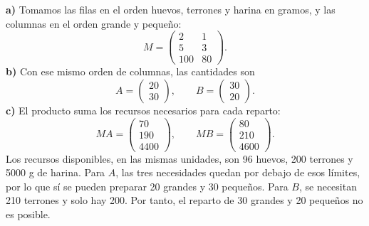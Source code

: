 \textbf{a)} Tomamos las filas en el orden huevos, terrones y harina en gramos, y las columnas en el orden grande y pequeño:
\[
 M=\boxed{\begin{pmatrix}2&1\\5&3\\100&80\end{pmatrix}}.
\]
\textbf{b)} Con ese mismo orden de columnas, las cantidades son
\[
 A=\begin{pmatrix}20\\30\end{pmatrix},\qquad
 B=\begin{pmatrix}30\\20\end{pmatrix}.
\]
\textbf{c)} El producto suma los recursos necesarios para cada reparto:
\[
 MA=\begin{pmatrix}70\\190\\4400\end{pmatrix},
 \qquad MB=\begin{pmatrix}80\\210\\4600\end{pmatrix}.
\]
Los recursos disponibles, en las mismas unidades, son 96 huevos, 200 terrones y 5000 g de harina. Para $A$, las tres necesidades quedan por debajo de esos límites, por lo que sí se pueden preparar 20 grandes y 30 pequeños. Para $B$, se necesitan 210 terrones y solo hay 200. Por tanto, el reparto de 30 grandes y 20 pequeños no es posible.
